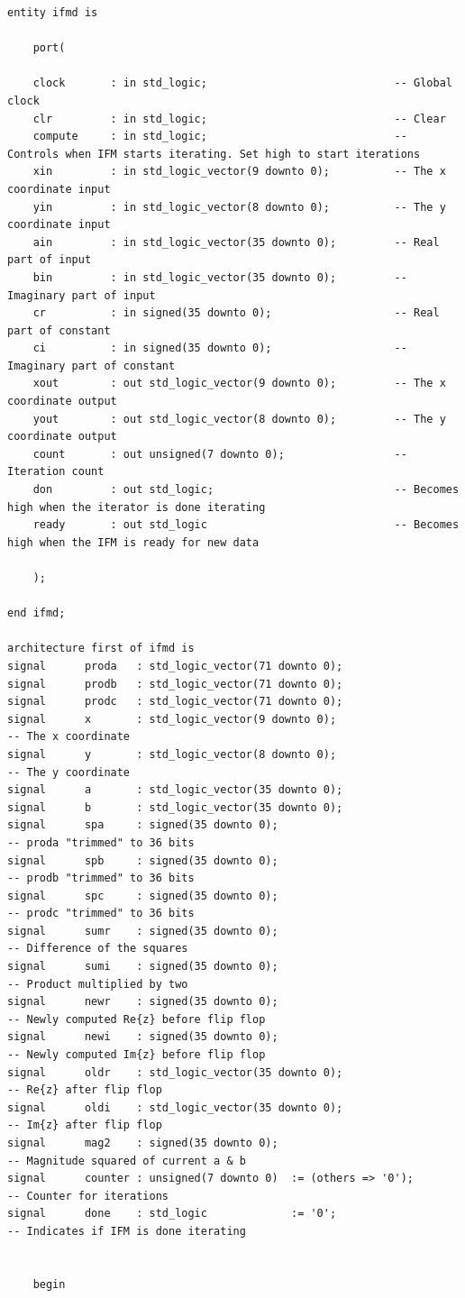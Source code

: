 \documentclass{article}
\begin{document}
\begin{lstlisting}
entity ifmd is

	port(

	clock		: in std_logic;								-- Global clock
	clr			: in std_logic;								-- Clear
	compute		: in std_logic;								-- Controls when IFM starts iterating. Set high to start iterations
	xin			: in std_logic_vector(9 downto 0);			-- The x coordinate input
	yin			: in std_logic_vector(8 downto 0);			-- The y coordinate input
	ain			: in std_logic_vector(35 downto 0);			-- Real part of input
	bin			: in std_logic_vector(35 downto 0);			-- Imaginary part of input
	cr			: in signed(35 downto 0);					-- Real part of constant
	ci			: in signed(35 downto 0);					-- Imaginary part of constant
	xout		: out std_logic_vector(9 downto 0);			-- The x coordinate output
	yout		: out std_logic_vector(8 downto 0);			-- The y coordinate output
	count		: out unsigned(7 downto 0);					-- Iteration count
	don			: out std_logic;							-- Becomes high when the iterator is done iterating
	ready		: out std_logic								-- Becomes high when the IFM is ready for new data

	);

end ifmd;

architecture first of ifmd is
signal		proda	: std_logic_vector(71 downto 0);
signal		prodb	: std_logic_vector(71 downto 0);
signal		prodc	: std_logic_vector(71 downto 0);
signal		x		: std_logic_vector(9 downto 0);						-- The x coordinate
signal  	y		: std_logic_vector(8 downto 0);						-- The y coordinate
signal		a		: std_logic_vector(35 downto 0);
signal		b		: std_logic_vector(35 downto 0);
signal		spa		: signed(35 downto 0);								-- proda "trimmed" to 36 bits
signal		spb		: signed(35 downto 0);								-- prodb "trimmed" to 36 bits
signal		spc		: signed(35 downto 0);								-- prodc "trimmed" to 36 bits
signal		sumr	: signed(35 downto 0);								-- Difference of the squares
signal		sumi	: signed(35 downto 0);								-- Product multiplied by two
signal		newr	: signed(35 downto 0);								-- Newly computed Re{z} before flip flop  
signal		newi	: signed(35 downto 0);								-- Newly computed Im{z} before flip flop  
signal		oldr	: std_logic_vector(35 downto 0);					-- Re{z} after flip flop  
signal		oldi	: std_logic_vector(35 downto 0);					-- Im{z} after flip flop  
signal		mag2	: signed(35 downto 0);								-- Magnitude squared of current a & b
signal		counter	: unsigned(7 downto 0)	:= (others => '0');			-- Counter for iterations
signal		done	: std_logic				:= '0';						-- Indicates if IFM is done iterating


	begin


\end{lstlisting}
\end{document}
